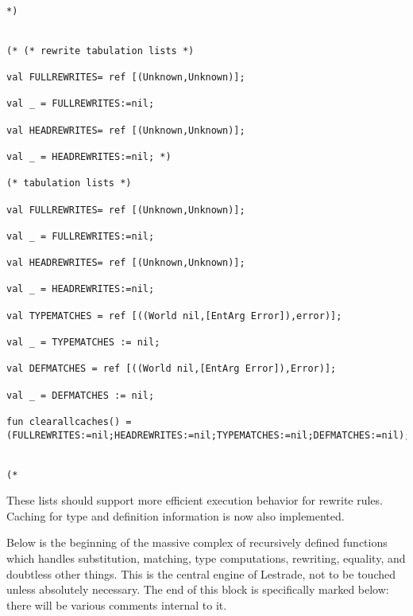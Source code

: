 \documentclass{article}
\begin{document}
\begin{verbatim}

*)


(* (* rewrite tabulation lists *)

val FULLREWRITES= ref [(Unknown,Unknown)];

val _ = FULLREWRITES:=nil;

val HEADREWRITES= ref [(Unknown,Unknown)];

val _ = HEADREWRITES:=nil; *)

(* tabulation lists *)

val FULLREWRITES= ref [(Unknown,Unknown)];

val _ = FULLREWRITES:=nil;

val HEADREWRITES= ref [(Unknown,Unknown)];

val _ = HEADREWRITES:=nil;

val TYPEMATCHES = ref [((World nil,[EntArg Error]),error)];

val _ = TYPEMATCHES := nil;

val DEFMATCHES = ref [((World nil,[EntArg Error]),Error)];

val _ = DEFMATCHES := nil;

fun clearallcaches() = (FULLREWRITES:=nil;HEADREWRITES:=nil;TYPEMATCHES:=nil;DEFMATCHES:=nil);


(*

\end{verbatim}

These lists should support more efficient execution behavior for rewrite rules.  Caching for type and definition information is now also implemented.

Below is the beginning of the massive complex of recursively defined functions which handles substitution, matching, type computations, rewriting, equality, and doubtless other things.  This is the central engine of Lestrade, not to be touched unless absolutely necessary.  The end of this block is specifically marked below:  there will be various comments internal to it.
\end{document}
